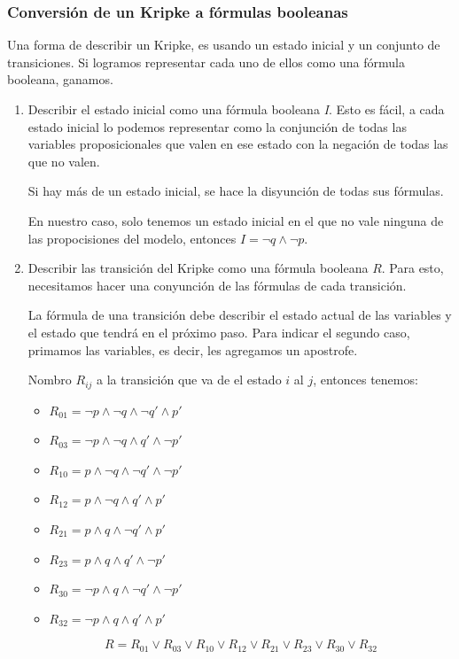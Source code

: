 \subsubsection{Conversión de un Kripke a fórmulas booleanas}
Una forma de describir un Kripke, es usando un estado inicial y un conjunto de transiciones. Si logramos representar cada uno de ellos como una fórmula booleana, ganamos.
\begin{enumerate}
\item Describir el estado inicial como una fórmula booleana \textit{I}. Esto es fácil, a cada estado inicial lo podemos representar como la conjunción de todas las variables proposicionales que valen en ese estado con la negación de todas las que no valen.

Si hay más de un estado inicial, se hace la disyunción de todas sus fórmulas.

\begin{center}
\begin{minipage}{0.8\textwidth}
En nuestro caso, solo tenemos un estado inicial en el que no vale ninguna de las propocisiones del modelo, entonces $I = \lnot q \land \lnot p$.
\end{minipage}
\end{center}

\item Describir las transición del Kripke como una fórmula booleana $R$. Para esto, necesitamos hacer una conyunción de las fórmulas de cada transición.

La fórmula de una transición debe describir el estado actual de las variables y el estado que tendrá en el próximo paso. Para indicar el segundo caso, primamos las variables, es decir, les agregamos un apostrofe.

\begin{center}
\begin{minipage}{0.8\textwidth}
Nombro $R_{ij}$ a la transición que va de el estado $i$ al $j$, entonces tenemos:
\begin{multicols}{2}
\begin{itemize}
\item[] $R_{01} = \lnot p \land\lnot q \land \lnot q' \land p'$
\item[] $R_{03} = \lnot p \land\lnot q \land q' \land \lnot p'$
\item[] $R_{10} = p \land\lnot q \land \lnot q' \land \lnot p'$
\item[] $R_{12} = p \land\lnot q \land q' \land p'$
\item[] $R_{21} = p \land q \land \lnot q' \land p'$
\item[] $R_{23} = p \land q \land q' \land \lnot p'$
\item[] $R_{30} = \lnot p \land q \land \lnot q' \land \lnot p'$
\item[] $R_{32} = \lnot p \land q \land q' \land p'$
\end{itemize}
\end{multicols}
$$R = R_{01} \lor R_{03} \lor R_{10} \lor R_{12} \lor R_{21} \lor R_{23}\lor R_{30} \lor R_{32}$$
\end{minipage}
\end{center}
\end{enumerate}

